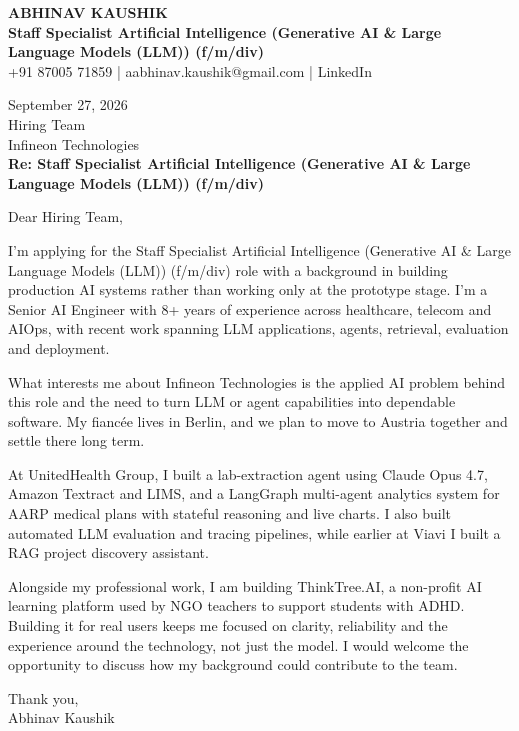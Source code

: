 \documentclass[10pt,a4paper]{article}
\begin{document}
\begin{center}
{\Large\bfseries ABHINAV KAUSHIK}\\[2pt]
{\bfseries Staff Specialist Artificial Intelligence (Generative AI \& Large Language Models (LLM)) (f/m/div)}\\[2pt]
+91 87005 71859 \quad | \quad aabhinav.kaushik@gmail.com \quad | \quad LinkedIn
\end{center}
\vspace{8pt}
September 27, 2026\\[6pt]
Hiring Team\\
Infineon Technologies\\[4pt]
\textbf{Re: Staff Specialist Artificial Intelligence (Generative AI \& Large Language Models (LLM)) (f/m/div)}

Dear Hiring Team,

I’m applying for the Staff Specialist Artificial Intelligence (Generative AI \& Large Language Models (LLM)) (f/m/div) role with a background in building production AI systems rather than working only at the prototype stage. I’m a Senior AI Engineer with 8+ years of experience across healthcare, telecom and AIOps, with recent work spanning LLM applications, agents, retrieval, evaluation and deployment.

What interests me about Infineon Technologies is the applied AI problem behind this role and the need to turn LLM or agent capabilities into dependable software. My fiancée lives in Berlin, and we plan to move to Austria together and settle there long term.

At UnitedHealth Group, I built a lab-extraction agent using Claude Opus 4.7, Amazon Textract and LIMS, and a LangGraph multi-agent analytics system for AARP medical plans with stateful reasoning and live charts. I also built automated LLM evaluation and tracing pipelines, while earlier at Viavi I built a RAG project discovery assistant.

Alongside my professional work, I am building ThinkTree.AI, a non-profit AI learning platform used by NGO teachers to support students with ADHD. Building it for real users keeps me focused on clarity, reliability and the experience around the technology, not just the model. I would welcome the opportunity to discuss how my background could contribute to the team.

Thank you,\\
Abhinav Kaushik
\end{document}
